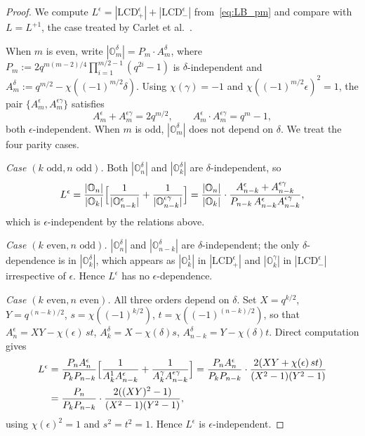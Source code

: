 \documentclass[11pt]{article}
\newcommand{\0}{\mathbf{0}}
\newcommand{\1}{\mathbf{1}}
\theoremstyle{plain}
\theoremstyle{definition}
\theoremstyle{remark}
\begin{document}
\begin{proof}
We compute $L^\epsilon = |\mathrm{LCD}^\epsilon_+| + |\mathrm{LCD}^\epsilon_-|$ from~\eqref{eq:LB_pm} and compare with $L = L^{+1}$, the case treated by Carlet et al.~\cite[Corollary~32]{carlet2019new}.

When $m$ is even, write $|\mathbb{O}_m^\delta| = P_m \cdot A_m^\delta$, where $P_m := 2 q^{m(m-2)/4} \prod_{i=1}^{m/2 - 1}(q^{2i} - 1)$ is $\delta$-independent and $A_m^\delta := q^{m/2} - \chi((-1)^{m/2}\delta)$. Using $\chi(\gamma) = -1$ and $\chi((-1)^{m/2}\epsilon)^2 = 1$, the pair $\{A_m^\epsilon, A_m^{\epsilon\gamma}\}$ satisfies
\[
A_m^\epsilon + A_m^{\epsilon\gamma} = 2 q^{m/2},
\qquad
A_m^\epsilon \cdot A_m^{\epsilon\gamma} = q^m - 1,
\]
both $\epsilon$-independent. When $m$ is odd, $|\mathbb{O}_m^\delta|$ does not depend on $\delta$. We treat the four parity cases.

\emph{Case $(k\text{ odd}, n\text{ odd})$.} Both $|\mathbb{O}_n^\delta|$ and $|\mathbb{O}_k^\delta|$ are $\delta$-independent, so
\[
L^\epsilon
= \frac{|\mathbb{O}_n|}{|\mathbb{O}_k|}\Bigl[\frac{1}{|\mathbb{O}_{n-k}^\epsilon|} + \frac{1}{|\mathbb{O}_{n-k}^{\epsilon\gamma}|}\Bigr]
= \frac{|\mathbb{O}_n|}{|\mathbb{O}_k|} \cdot \frac{A_{n-k}^\epsilon + A_{n-k}^{\epsilon\gamma}}{P_{n-k}\, A_{n-k}^\epsilon A_{n-k}^{\epsilon\gamma}},
\]
which is $\epsilon$-independent by the relations above.

\emph{Case $(k\text{ even}, n\text{ odd})$.} $|\mathbb{O}_n^\delta|$ and $|\mathbb{O}_{n-k}^\delta|$ are $\delta$-independent; the only $\delta$-dependence is in $|\mathbb{O}_k^\delta|$, which appears as $|\mathbb{O}_k^1|$ in $|\mathrm{LCD}^\epsilon_+|$ and $|\mathbb{O}_k^\gamma|$ in $|\mathrm{LCD}^\epsilon_-|$ irrespective of $\epsilon$. Hence $L^\epsilon$ has no $\epsilon$-dependence.

\emph{Case $(k\text{ even}, n\text{ even})$.} All three orders depend on $\delta$. Set $X = q^{k/2}$, $Y = q^{(n-k)/2}$, $s = \chi((-1)^{k/2})$, $t = \chi((-1)^{(n-k)/2})$, so that $A_n^\epsilon = XY - \chi(\epsilon)\, st$, $A_k^\delta = X - \chi(\delta) s$, $A_{n-k}^\delta = Y - \chi(\delta) t$. Direct computation gives
\[
\begin{aligned}
L^\epsilon
&= \frac{P_n A_n^\epsilon}{P_k P_{n-k}}\Bigl[\frac{1}{A_k^1 A_{n-k}^\epsilon} + \frac{1}{A_k^\gamma A_{n-k}^{\epsilon\gamma}}\Bigr]
= \frac{P_n A_n^\epsilon}{P_k P_{n-k}} \cdot \frac{2(XY + \chi(\epsilon)\, st)}{(X^2 - 1)(Y^2 - 1)} \\
&= \frac{P_n}{P_k P_{n-k}} \cdot \frac{2((XY)^2 - 1)}{(X^2 - 1)(Y^2 - 1)},
\end{aligned}
\]
using $\chi(\epsilon)^2 = 1$ and $s^2 = t^2 = 1$. Hence $L^\epsilon$ is $\epsilon$-independent.


\end{proof}
\end{document}
